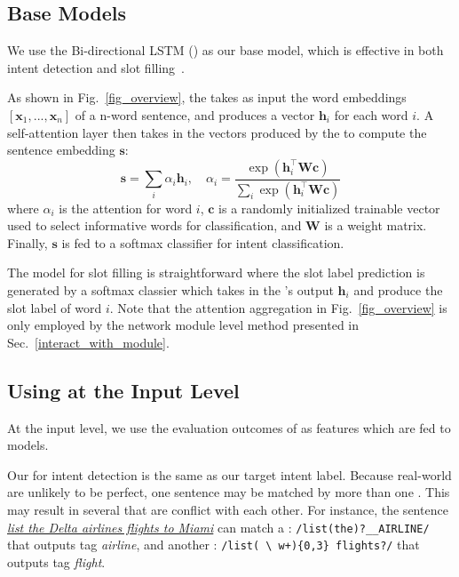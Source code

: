 \subsection{Base Models}
\label{sec:baseline}
We use the Bi-directional LSTM (\BLSTM) as our base \NN model, which is effective in both intent detection and slot
filling~\cite{liu2016attention}.

 As shown in Fig.~\ref{fig_overview}, the \BLSTM takes as input the word embeddings $[\textbf{x}_1, ...,
\textbf{x}_n]$ of a n-word sentence, and produces a vector $\textbf{h}_i$ for each word $i$. A self-attention layer then takes in the
vectors produced by the \BLSTM to compute the sentence embedding $\textbf{s}$:
\begin{equation}
\textbf{s} = \sum_{i}{\alpha_i\textbf{h}_i}, \quad \alpha_i=\frac{\exp(\textbf{h}_i^\intercal \textbf{Wc})}{\sum_{i}{\exp(\textbf{h}_i^\intercal \textbf{Wc})}}
\label{eq:simple_att}
\end{equation}
where  $\alpha_i$ is the attention for word $i$, $\textbf{c}$ is a randomly initialized trainable vector used to select informative words for classification, and $\textbf{W}$ is a weight matrix.
Finally, $\textbf{s}$ is fed to a softmax classifier for intent classification.

 The model for slot filling is  straightforward where the slot label prediction is generated by a softmax
classier which takes in the \BLSTM's output $\textbf{h}_i$ and produce the slot label of word $i$. Note that the attention
aggregation in Fig.~\ref{fig_overview} is only employed by the network module level method presented in Sec.~\ref{interact_with_module}.


\subsection{Using \REs at the Input Level}
\label{fusion_with_input}
At the input level, we use the evaluation outcomes of \REs as features which are fed to \NN models.

Our \REtag for intent detection is the same as our target intent label.
Because real-world \REs are unlikely to be perfect, one sentence may be matched by more than one \RE. This may result in several \REtags
that are conflict with each other. For instance, the sentence \textsl{\underline{list the Delta airlines flights to Miami}} can match a
\RE: {\small \texttt{/list(\;the)?\;\_\_AIRLINE/}} that outputs tag \emph{airline}, and another \RE: {\small \texttt{/list(\,\textbackslash
w+)\{0,3\} flights?/}} that outputs tag \emph{flight}.


